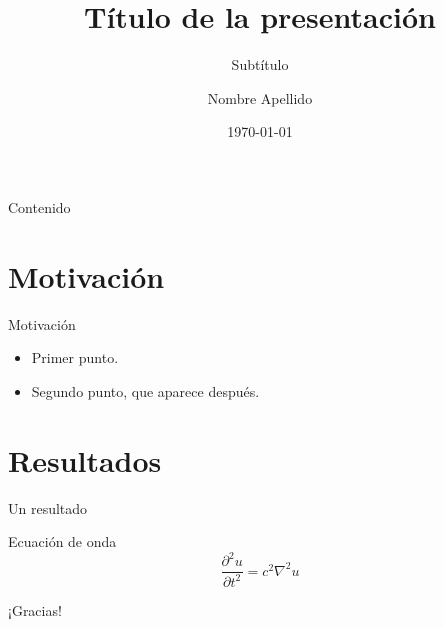 \documentclass[aspectratio=169]{beamer}
\title{Título de la presentación}
\subtitle{Subtítulo}
\author{Nombre Apellido}
\institute{Institución}
\date{\today}
\begin{document}
\begin{frame}
  \titlepage
\end{frame}

\begin{frame}{Contenido}
  \tableofcontents
\end{frame}

\section{Motivación}

\begin{frame}{Motivación}
  \begin{itemize}
    \item<1-> Primer punto.
    \item<2-> Segundo punto, que aparece después.
  \end{itemize}
\end{frame}

\section{Resultados}

\begin{frame}{Un resultado}
  \begin{block}{Ecuación de onda}
    \[
      \frac{\partial^2 u}{\partial t^2} = c^2 \nabla^2 u
    \]
  \end{block}
\end{frame}

\begin{frame}
  \centering\Large ¡Gracias!
\end{frame}
\end{document}
